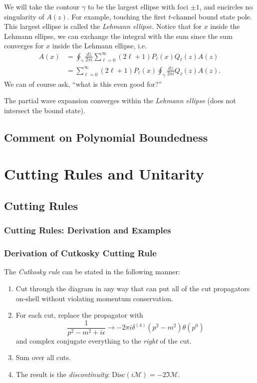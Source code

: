 \documentclass[a4paper,11pt]{article}
\begin{document}
We will take the contour $\gamma$ to be the largest ellipse with foci $\pm 1$, and encircles no singularity of $A(z)$. For example, touching the first $t$-channel bound state pole. This largest ellipse is called the \textit{Lehmann ellipse}. Notice that for $x$ inside the Lehmann ellipse, we can exchange the integral with the sum since the sum converges for $x$ inside the Lehmann ellipse, i.e.
\begin{align}
    A(x) & = \oint_\gamma\frac{dz}{2\pi i}\sum_{\ell=0}^\infty(2\ell+1)P_\ell(x)Q_\ell(z)A(z)\nonumber\\
    & = \sum_{\ell=0}^\infty(2\ell+1)P_\ell(x)\oint_\gamma\frac{dz}{2\pi i}Q_\ell(z)A(z)\label{lehmann ellipse integral of A(x)}.
\end{align}
We can of course ask, ``what is this even good for?'' 




The partial wave expansion converges within the \textit{Lehmann ellipse} (does not intersect the bound state).

\subsection{Comment on Polynomial Boundedness}

\section{Cutting Rules and Unitarity}
\subsection{Cutting Rules}
\subsubsection{Cutting Rules: Derivation and Examples}

\subsubsection*{Derivation of Cutkosky Cutting Rule}

The \textit{Cutkosky rule} can be stated in the following manner:
\begin{enumerate}
    \item Cut through the diagram in any way that can put all of the cut propagators on-shell without violating momentum conservation.
    \item For each cut, replace the propagator with 
    \begin{equation}\label{eqn:cut rule for propagator}
        \frac{1}{p^2-m^2 + i\epsilon}\rightarrow -2\pi i\delta^{(4)}(p^2-m^2)\theta(p^0)
    \end{equation}
    and complex conjugate everything to the \textit{right} of the cut.
    \item Sum over all cuts.
    \item The result is the \textit{discontinuity}: $\text{Disc}(i\mathcal{M}) = -2\Im\mathcal{M}$.
\end{enumerate}
\end{document}
